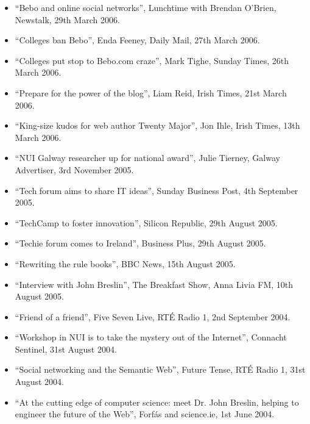 \documentclass[10pt,a4paper]{res} %
\begin{document}
\begin{resume}
{\begin{itemize}
\item ``Bebo and online social networks'', Lunchtime with Brendan O'Brien, Newstalk, 29th March 2006.
\item ``Colleges ban Bebo'', Enda Feeney, Daily Mail, 27th March 2006.
\item ``Colleges put stop to Bebo.com craze'', Mark Tighe, Sunday Times, 26th March 2006.
\item ``Prepare for the power of the blog'', Liam Reid, Irish Times, 21st March 2006.
\item ``King-size kudos for web author Twenty Major'', Jon Ihle, Irish Times, 13th March 2006.
\item ``NUI Galway researcher up for national award'', Julie Tierney, Galway Advertiser, 3rd November 2005.
\item ``Tech forum aims to share IT ideas'', Sunday Business Post, 4th September 2005.
\item ``TechCamp to foster innovation'', Silicon Republic, 29th August 2005.
\item ``Techie forum comes to Ireland'', Business Plus, 29th August 2005.
\item ``Rewriting the rule books'', BBC News, 15th August 2005.
\item ``Interview with John Breslin'', The Breakfast Show, Anna Livia FM, 10th August 2005.
\item ``Friend of a friend'', Five Seven Live, RT\'{E} Radio 1, 2nd September 2004.
\item ``Workshop in NUI is to take the mystery out of the Internet'', Connacht Sentinel, 31st August 2004.
\item ``Social networking and the Semantic Web'', Future Tense, RT\'{E} Radio 1, 31st August 2004.
\item ``At the cutting edge of computer science: meet Dr. John Breslin, helping to engineer the future of the Web'', Forf\'{a}s and science.ie, 1st June 2004.
\end{itemize}

} %


\vspace{0.2in} %



\end{resume}
\end{document}
